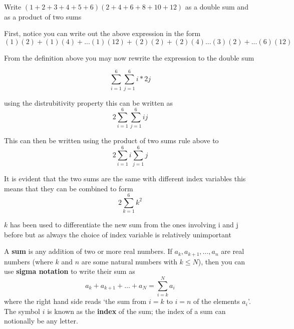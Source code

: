\documentclass[
  12pt,
  a4paper, oneside]{starmastarticle}
\begin{document}
\begin{tcolorbox}[enhanced jigsaw, colframe=quarto-callout-note-color-frame, breakable, rightrule=.15mm, opacityback=0, bottomrule=.15mm, colback=white, toprule=.15mm, leftrule=.75mm, left=2mm, arc=.35mm]
\begin{minipage}[t]{5.5mm}
\textcolor{quarto-callout-note-color}{\faInfo}
\end{minipage}%
\begin{minipage}[t]{\textwidth - 5.5mm}
Write \((1+2+3+4+5+6)(2+4+6+8+10+12)\) as a double sum and as a product
of two sums

First, notice you can write out the above expression in the form
\((1)(2) + (1)(4) + ... (1)(12) + (2)(2) + (2)(4) ... (3)(2) + ...(6)(12)\)

From the definition above you may now rewrite the expression to the
double sum

\[\sum_{i=1}^6\sum_{j=1}^6 i*2j\]

using the distrubitivity property this can be written as
\[2\sum_{i=1}^6\sum_{j=1}^6 ij\]

This can then be written using the product of two sums rule above to
\[2\sum_{i=1}^6i\sum_{j=1}^6j\]

It is evident that the two sums are the same with different index
variables this means that they can be combined to form
\[2\sum_{k=1}^6k^2\]

\(k\) has been used to differentiate the new sum from the ones involving
i and j before but as always the choice of index variable is relatively
unimportant\end{minipage}%
\end{tcolorbox}

\begin{tcolorbox}[enhanced jigsaw, colframe=quarto-callout-note-color-frame, breakable, rightrule=.15mm, opacityback=0, bottomrule=.15mm, colback=white, toprule=.15mm, leftrule=.75mm, left=2mm, arc=.35mm]
\begin{minipage}[t]{5.5mm}
\textcolor{quarto-callout-note-color}{\faInfo}
\end{minipage}%
\begin{minipage}[t]{\textwidth - 5.5mm}
A \textbf{sum} is any addition of two or more real numbers. If
\(a_k,a_{k+1}, \ldots, a_n\) are real numbers (where \(k\) and \(n\) are
some natural numbers with \(k\leq N\)), then you can use \textbf{sigma
notation} to write their sum as
\[a_k + a_{k+1} + \ldots + a_N = \sum_{i = k}^N a_i\] where the right
hand side reads `the sum from \(i = k\) to \(i = n\) of the elements
\(a_i\)'. The symbol \(i\) is known as the \textbf{index} of the sum;
the index of a sum can notionally be any letter.\end{minipage}%
\end{tcolorbox}
\end{document}
